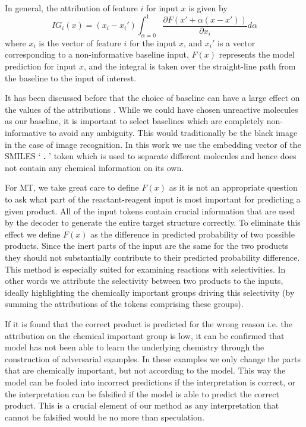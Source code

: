 In general, the attribution of feature $i$ for input $x$ is given by
\begin{equation}
\label{eqn:IG}
    IG_i(x) = (x_i - x_i') \int_{\alpha=0}^1 \frac{\partial F(x' + \alpha(x-x'))}{\partial x_i} d\alpha
\end{equation}
where $x_i$ is the vector of feature $i$ for the input $x$, and $x_i'$ is a vector corresponding to a non-informative baseline input, $F(x)$ represents the model prediction for input $x$, and the integral is taken over the straight-line path from the baseline to the input of interest. 

It has been discussed before that the choice of baseline can have a large effect on the values of the attributions \cite{sturmfels2020visualizing}. While we could have chosen unreactive molecules as our baseline, it is important to select baselines which are completely non-informative to avoid any ambiguity. This would traditionally be the black image in the case of image recognition. In this work we use the embedding vector of the SMILES ` \textbf{.} ' token which is used to separate different molecules and hence does not contain any chemical information on its own.

For MT, we take great care to define $F(x)$ as it is not an appropriate question to ask what part of the reactant-reagent input is most important for predicting a given product. All of the input tokens contain crucial information that are used by the decoder to generate the entire target structure correctly. To eliminate this effect we define $F(x)$ as the difference in predicted probability of two possible products. Since the inert parts of the input are the same for the two products they should not substantially contribute to their predicted probability difference. This method is especially suited for examining reactions with selectivities. In other words we attribute the selectivity between two products to the inputs, ideally highlighting the chemically important groups driving this selectivity (by summing the attributions of the tokens comprising these groups).

If it is found that the correct product is predicted for the wrong reason i.e. the attribution on the chemical important group is low, it can be confirmed that model has not been able to learn the underlying chemistry through the construction of adversarial examples. In these examples we only change the parts that are chemically important, but not according to the model. This way the model can be fooled into incorrect predictions if the interpretation is correct, or the interpretation can be falsified if the model is able to predict the correct product. This is a crucial element of our method as any interpretation that cannot be falsified would be no more than speculation.


